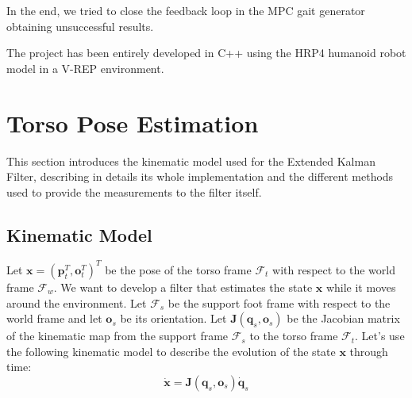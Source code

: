 \documentclass[a4paper]{article}
\begin{document}
In the end, we tried to close the feedback loop in the
MPC gait generator obtaining unsuccessful results.

The project has been entirely developed in C++ using the HRP4 humanoid robot
model in a V-REP environment.

\clearpage
\section{Torso Pose Estimation}
This section introduces the kinematic model used for the Extended Kalman Filter,
describing in details its whole implementation and the different methods used
to provide the measurements to the filter itself.

\subsection{Kinematic Model}
Let $\bm{x} = (\bm{p}_t^T, \bm{o}_t^T)^T$ be the pose of the torso frame $\mathcal{F}_t$
with respect to the world frame $\mathcal{F}_w$. We want to
develop a filter that estimates the state $\bm{x}$ while
it moves around the environment. Let $\mathcal{F}_s$ be the
support foot frame with respect to the world frame and let
$\bm{o}_s$ be its orientation.
Let $\bm{J}(\bm{q}_s, \bm{o}_s)$ be the Jacobian
matrix of the kinematic map from the support frame
$\mathcal{F}_s$ to the torso frame $\mathcal{F}_t$.
Let's use the following kinematic model to describe the
evolution of the state $\bm{x}$ through time:
\begin{equation}
    \bm{\dot{x}} = \bm{J}(\bm{q}_s, \bm{o}_s) \bm{\dot{q}}_s
    \label{eq:hrp4-kinematic-model}
\end{equation}
\end{document}
